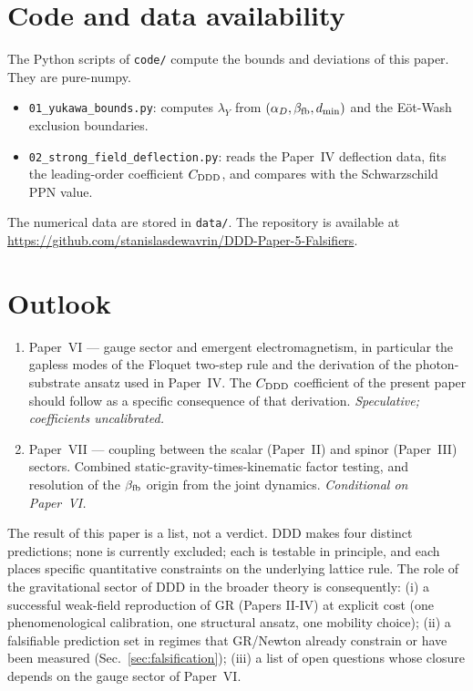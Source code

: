 \documentclass[11pt,a4paper]{article}
\begin{document}
\section{Code and data availability}
\label{sec:code}

The Python scripts of \texttt{code/} compute the bounds and
deviations of this paper. They are pure-numpy.

\begin{itemize}
\item \texttt{01\_yukawa\_bounds.py}: computes $\lambda_Y$ from
$(\alpha_D, \beta_{\rm fb}, d_{\min})$ and the E\"{o}t-Wash exclusion
boundaries.
\item \texttt{02\_strong\_field\_deflection.py}: reads the Paper~IV
deflection data, fits the leading-order coefficient
$C_{\rm DDD}$, and compares with the Schwarzschild PPN value.
\end{itemize}
The numerical data are stored in \texttt{data/}. The repository
is available at
\url{https://github.com/stanislasdewavrin/DDD-Paper-5-Falsifiers}.

\section{Outlook}
\label{sec:outlook}

\begin{enumerate}
\item Paper~VI --- gauge sector and emergent electromagnetism, in
particular the gapless modes of the Floquet two-step rule and the
derivation of the photon-substrate ansatz used in Paper~IV. The
$C_{\rm DDD}$ coefficient of the present paper should follow as a
specific consequence of that derivation. \emph{Speculative; coefficients
uncalibrated.}
\item Paper~VII --- coupling between the scalar (Paper~II) and spinor
(Paper~III) sectors. Combined static-gravity-times-kinematic factor
testing, and resolution of the $\beta_{\rm fb}$ origin from the
joint dynamics. \emph{Conditional on Paper~VI.}
\end{enumerate}

The result of this paper is a list, not a verdict. DDD makes four
distinct predictions; none is currently excluded; each is testable in
principle, and each places specific quantitative constraints on the
underlying lattice rule. The role of the gravitational sector of DDD
in the broader theory is consequently:
(i) a successful weak-field reproduction of GR (Papers II-IV) at
explicit cost (one phenomenological calibration, one structural ansatz,
one mobility choice);
(ii) a falsifiable prediction set in regimes that GR/Newton already
constrain or have been measured (Sec.~\ref{sec:falsification});
(iii) a list of open questions whose closure depends on the gauge
sector of Paper~VI.
\end{document}
